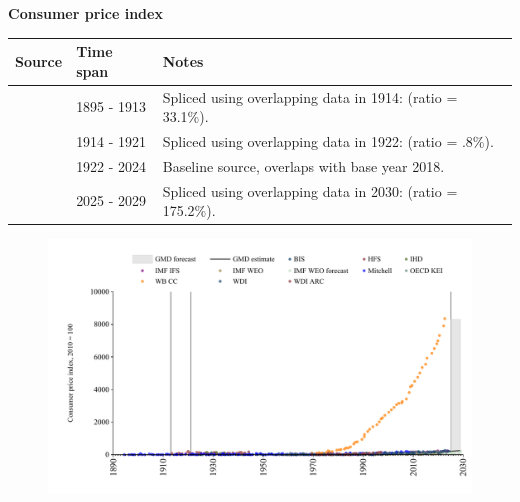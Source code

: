 \documentclass[12pt,a4paper,landscape]{article}
\begin{document}
\begin{adjustbox}{max totalsize={\paperwidth}{\paperheight},center}
\begin{minipage}[t][\textheight][t]{\textwidth}
\vspace*{0.5cm}
{}
\begin{center}
{\Large\bfseries Consumer price index}
\end{center}
\vspace{0.5cm}
\begin{table}[H]
\centering
\small
\begin{tabular}{|l|l|l|}
\hline
\textbf{Source} & \textbf{Time span} & \textbf{Notes} \\
\hline
\rowcolor{white}\cite{Mitchell}& 1895 - 1913 &Spliced using overlapping data in 1914: (ratio = 33.1\%). \\
\rowcolor{lightgray}\cite{HFS}& 1914 - 1921 &Spliced using overlapping data in 1922: (ratio = .8\%). \\
\rowcolor{white}\cite{BIS}& 1922 - 2024 &Baseline source, overlaps with base year 2018. \\
\rowcolor{lightgray}\cite{IMF_WEO_forecast}& 2025 - 2029 &Spliced using overlapping data in 2030: (ratio = 175.2\%). \\
\hline
\end{tabular}
\end{table}
\begin{figure}[H]
\centering
\includegraphics[width=\textwidth,height=0.6\textheight,keepaspectratio]{graphs/ZAF_CPI.pdf}
\end{figure}
\end{minipage}
\end{adjustbox}
\end{document}

